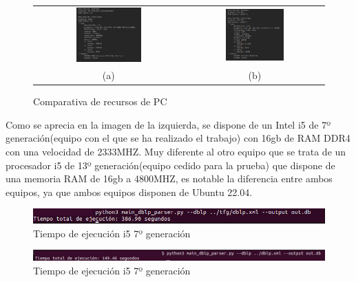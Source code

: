 \documentclass[a4paper, 12pt]{book}
\begin{document}
\begin{figure}[h]
    \centering
    \begin{tabular}{cc}
    \includegraphics[width=0.46\textwidth]{img/pc_s.png} &  
    \includegraphics[width=0.44\textwidth]{img/pc_b.png} \\
    (a) &(b)
    \end{tabular}
    \caption{Comparativa de recursos de PC}
    \label{fig:comparativa_pc}
\end{figure}

Como se aprecia en la imagen de la izquierda, se dispone de un Intel i5 de 7º generación(equipo con el que se ha realizado el trabajo) con 16gb de RAM DDR4 con una velocidad de 2333MHZ. Muy diferente al otro equipo que se trata de un procesador i5 de 13º generación(equipo cedido para la prueba) que dispone de una memoria RAM de 16gb a 4800MHZ, es notable la diferencia entre ambos equipos, ya que ambos equipos disponen de Ubuntu 22.04.

\begin{figure}[h]
  \centering
  \includegraphics[width=16cm, keepaspectratio]{img/ej_time_i5_7a.png}
  \caption{Tiempo de ejecución i5 7º generación}
  \label{fig:time_s}
\end{figure}
\begin{figure}[h]
  \centering
  \includegraphics[width=16cm, keepaspectratio]{img/ej_time_i5_13a.png}
  \caption{Tiempo de ejecución i5 7º generación}
  \label{fig:time_b}
\end{figure}
\end{document}
